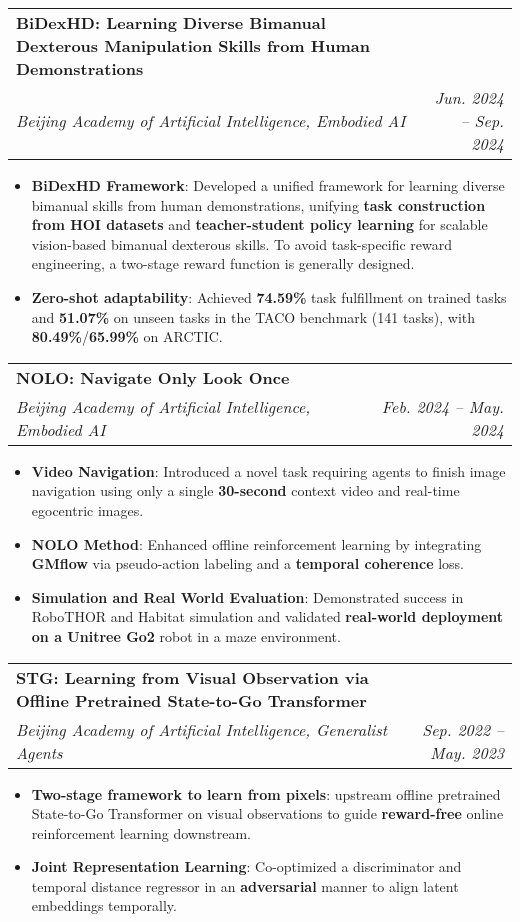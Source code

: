 \documentclass[letterpaper,11pt]{article}
\makeatletter
\newcommand{\resumeItem}[1]{
  \item{
    {#1 \vspace{-4pt}}
  }
}
\newcommand{\resumeSubheading}[4]{
  \vspace{-2pt}\item
    \begin{tabular*}{0.97\textwidth}[t]{l@{\extracolsep{\fill}}r}
      \textbf{#1} & #2 \\
      \textit{\small #3} & \textit{\small #4} \\
    \end{tabular*}\vspace{-10pt}
}
\newcommand{\resumeItemListStart}{\begin{itemize}}
\newcommand{\resumeItemListEnd}{\end{itemize}\vspace{-2pt}}
\makeatother
\begin{document}
\resumeSubheading
    {BiDexHD: Learning Diverse Bimanual Dexterous Manipulation Skills from Human Demonstrations}{}{Beijing Academy of Artificial Intelligence, Embodied AI}{\hspace{-1.8cm}Jun. 2024 -- Sep. 2024}
    \vspace{0.1cm}
    \resumeItemListStart
        \resumeItem{\textbf{BiDexHD Framework}: Developed a unified framework for learning diverse bimanual skills from human demonstrations, unifying \textbf{task construction from HOI datasets} and \textbf{teacher-student policy learning} for scalable vision-based bimanual dexterous skills. To avoid task-specific reward engineering, a two-stage reward function is generally designed.}
        \resumeItem{\textbf{Zero-shot adaptability}: Achieved \textbf{74.59\%} task fulfillment on trained tasks and \textbf{51.07\%} on unseen tasks in the TACO benchmark (141 tasks), with \textbf{80.49\%}/\textbf{65.99\%} on ARCTIC.}
    \resumeItemListEnd

\resumeSubheading
    {NOLO: Navigate Only Look Once}{}{Beijing Academy of Artificial Intelligence, Embodied AI}{\hspace{1.3cm}Feb. 2024 -- May. 2024}
    \vspace{0.1cm}
    \resumeItemListStart
        \resumeItem{\textbf{Video Navigation}: Introduced a novel task requiring agents to finish image navigation using only a single \textbf{30-second} context video and real-time egocentric images.}
        \resumeItem{\textbf{NOLO Method}: Enhanced offline reinforcement learning by integrating \textbf{GMflow} via pseudo-action labeling and a \textbf{temporal coherence} loss.}
        \resumeItem{\textbf{Simulation and Real World Evaluation}: Demonstrated success in RoboTHOR and Habitat simulation and validated \textbf{real-world deployment on a Unitree Go2} robot in a maze environment.}
    \resumeItemListEnd

\resumeSubheading
    {STG: Learning from Visual Observation via Offline Pretrained State-to-Go Transformer}{}{Beijing Academy of Artificial Intelligence, Generalist Agents}{Sep. 2022 -- May. 2023}
    \vspace{0.1cm}
    \resumeItemListStart
        \resumeItem{\textbf{Two-stage framework to learn from pixels}: upstream offline pretrained State-to-Go Transformer on visual observations to guide \textbf{reward-free} online reinforcement learning downstream.}
        \resumeItem{\textbf{Joint Representation Learning}: Co-optimized a discriminator and temporal distance regressor in an \textbf{adversarial} manner to align latent embeddings temporally.}
    \resumeItemListEnd
\end{document}
